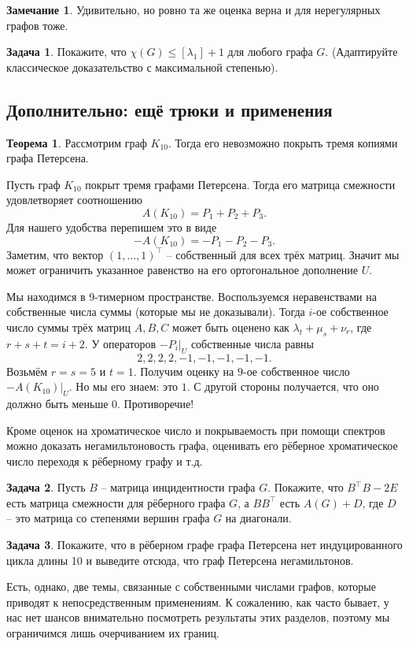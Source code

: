 \documentclass[10pt,a4paper,oneside]{book}
\theoremstyle{definition}
\newtheorem*{rem}{\color{green!50!blue}Замечание}
\newtheorem{zad}{\color{violet!100!black}Задача}
\newtheorem{thm}{\color{red!40!black}Теорема}
\renewcommand{\leq}{\leqslant}
\def\thrm{\begin{thm}}
\def\ethrm{\end{thm}}
\def\zd{\begin{zad}}
\def\ezd{\end{zad}}
\def\rm{\begin{rem}}
\def\erm{\end{rem}}
\begin{document}
\rm Удивительно, но ровно та же оценка верна и для нерегулярных графов тоже.
\erm

\zd Покажите, что $\chi(G) \leq [\lambda_1]+1$ для любого графа $G$. (Адаптируйте классическое доказательство с максимальной степенью).
\ezd


\subsection{Дополнительно: ещё трюки и применения}

\thrm Рассмотрим граф $K_{10}$. Тогда его невозможно покрыть тремя копиями графа Петерсена.
\ethrm
\proof Пусть граф $K_{10}$ покрыт тремя графами Петерсена. Тогда его матрица смежности удовлетворяет соотношению 
$$A(K_{10})=P_1+P_2+P_3.$$
Для нашего удобства перепишем это в виде 
$$-A(K_{10})=-P_1-P_2-P_3.$$
Заметим, что вектор $(1,\dots,1)^\top$ -- собственный для всех трёх матриц. Значит мы может ограничить указанное равенство на его ортогональное дополнение $U$.

Мы находимся в 9-тимерном пространстве. Воспользуемся неравенствами на собственные числа суммы (которые мы не доказывали). Тогда $i$-ое собственное число  суммы трёх матриц $A,B,C$ может быть оценено как $\lambda_t +\mu_s+ \nu_r$, где $r+s+t=i+2$. У операторов $-P_i|_U$ собственные числа равны $$2,2,2,2,-1,-1,-1,-1,-1.$$
Возьмём  $r=s=5$ и $t=1$. Получим оценку на $9$-ое собственное число $-A(K_{10})|_U$. Но мы его знаем: это $1$. С другой стороны получается, что оно должно быть меньше $0$. Противоречие! 
\endproof

Кроме оценок на хроматическое число и покрываемость при помощи спектров можно доказать негамильтоновость графа, оценивать его рёберное хроматическое число переходя к рёберному графу и т.д.

\zd Пусть $B$ -- матрица инцидентности графа $G$. Покажите, что $B^\top B - 2 E$ есть матрица смежности для рёберного графа $G$, а $B B^\top$ есть $A(G)+D$, где $D$ -- это матрица со степенями вершин графа $G$ на диагонали. 
\ezd

\zd Покажите, что в рёберном графе графа Петерсена нет индуцированного цикла длины 10 и выведите отсюда, что граф Петерсена негамильтонов.
\ezd

Есть, однако, две темы, связанные с собственными числами графов, которые приводят к непосредственным применениям. К сожалению, как часто бывает, у нас нет шансов внимательно посмотреть результаты этих разделов, поэтому мы ограничимся лишь очерчиванием их границ.
\end{document}
